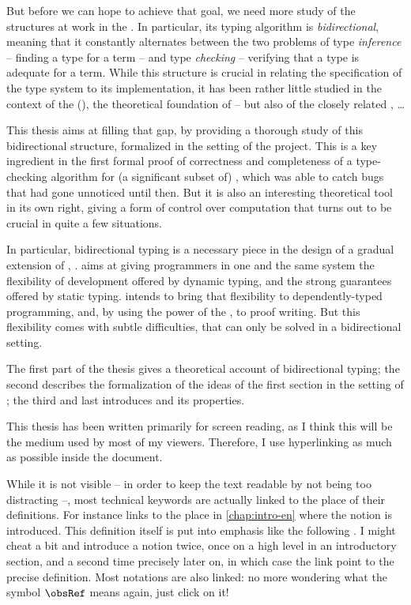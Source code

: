 But before we can hope to achieve that goal, we need more study of the structures at work
in the . In particular, its typing algorithm is \emph{bidirectional}, meaning that
it constantly alternates between the two problems of type \emph{inference} – finding a type for
a term – and type \emph{checking} – verifying that a type is adequate for a term. While this
structure is crucial in relating the specification of the type system to its implementation,
it has been rather little studied in the context of the 
(), the theoretical foundation of  – but also of the closely related
, …

This thesis aims at filling that gap, by providing a thorough study of this bidirectional
structure, formalized in the setting of the  project. This is a key
ingredient in the first formal proof of correctness and completeness of a type-checking
algorithm for (a significant subset of) , which was able to catch bugs that had gone
unnoticed until then.
But it is also an interesting theoretical tool in its own right, giving a form of control
over computation that turns out to be crucial in quite a few situations.

In particular, bidirectional typing is a necessary piece in the design of a gradual extension of
, .
 aims at giving programmers in one and the same system the flexibility of
development offered by dynamic typing, and the strong guarantees offered
by static typing.  intends
to bring that flexibility to dependently-typed programming,
and, by using the power of the , to proof writing.
But this flexibility comes with subtle difficulties, that can only be solved in a bidirectional
setting.

The first part of the thesis gives a theoretical account of bidirectional typing; the second
describes the formalization of the ideas of the first section in the setting of ;
the third and last introduces  and its properties.



This thesis has been written primarily for screen reading, as I think this will be the medium
used by most of my viewers. Therefore, I use hyperlinking as much as possible
inside the document.

While it is not visible – in order to keep the text readable by not being too distracting –,
most technical keywords are actually linked to the
place of their definitions. For instance  links to
the place in \cref{chap:intro-en} where the notion is introduced.
This definition itself is put into emphasis like the following .
I might cheat a bit and introduce a notion twice, once on a high level in an introductory
section, and a second time precisely later on, in which case the link point to the precise
definition. Most notations are also linked: no more wondering what the symbol $\obsRef$
means again, just click on it!

